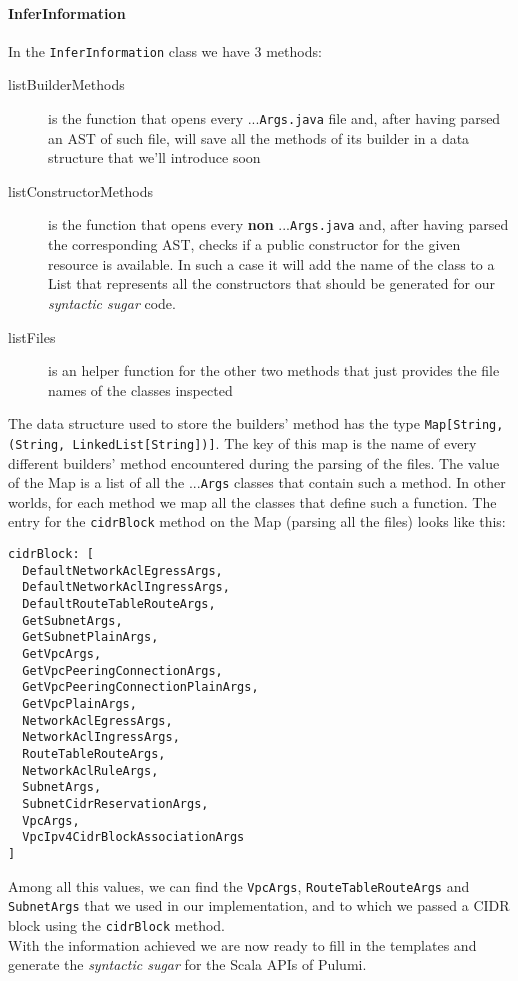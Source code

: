 \paragraph{InferInformation}
In the \texttt{InferInformation} class we have 3 methods:
\begin{description}
  \item[listBuilderMethods] is the function that opens every ...\texttt{Args.java} file and, after having parsed an AST of such file, will save all the methods of its builder in a data structure that we'll introduce soon
  \item[listConstructorMethods] is the function that opens every \textbf{non} ...\texttt{Args.java} and, after having parsed the corresponding AST, checks if a public constructor for the given resource is available. In such a case it will add the name of the class to a List that represents all the constructors that should be generated for our \textit{syntactic sugar} code.
  \item[listFiles] is an helper function for the other two methods that just provides the file names of the classes inspected
\end{description}
The data structure used to store the builders' method has the type \texttt{Map[String, (String, LinkedList[String])]}.
The key of this map is the name of every different builders' method encountered during the parsing of the files.
The value of the Map is a list of all the ...\texttt{Args} classes that contain such a method.
In other worlds, for each method we map all the classes that define such a function.
The entry for the \texttt{cidrBlock} method on the Map (parsing all the files) looks like this:
\begin{verbatim}
cidrBlock: [
  DefaultNetworkAclEgressArgs,
  DefaultNetworkAclIngressArgs,
  DefaultRouteTableRouteArgs,
  GetSubnetArgs,
  GetSubnetPlainArgs,
  GetVpcArgs,
  GetVpcPeeringConnectionArgs,
  GetVpcPeeringConnectionPlainArgs,
  GetVpcPlainArgs,
  NetworkAclEgressArgs,
  NetworkAclIngressArgs,
  RouteTableRouteArgs,
  NetworkAclRuleArgs,
  SubnetArgs,
  SubnetCidrReservationArgs,
  VpcArgs,
  VpcIpv4CidrBlockAssociationArgs
]
\end{verbatim}
Among all this values, we can find the \texttt{VpcArgs}, \texttt{RouteTableRouteArgs} and \texttt{SubnetArgs} that we used in our implementation, and to which we passed a CIDR block using the \texttt{cidrBlock} method.\\
With the information achieved we are now ready to fill in the templates and generate the \textit{syntactic sugar} for the Scala APIs of Pulumi.

